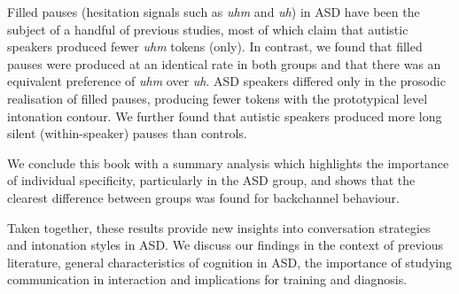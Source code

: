 Filled pauses (hesitation signals such as \emph{uhm} and \emph{uh}) in ASD have been the subject of a handful of previous studies, most of which claim that autistic speakers produced fewer \emph{uhm} tokens (only). In contrast, we found that filled pauses were produced at an identical rate in both groups and that there was an equivalent preference of \emph{uhm} over \emph{uh}. ASD speakers differed only in the prosodic realisation of filled pauses, producing fewer tokens with the prototypical level intonation contour. We further found that autistic speakers produced more long silent (within-speaker) pauses than controls.

We conclude this book with a summary analysis which highlights the importance of individual specificity, particularly in the ASD group, and shows that the clearest difference between groups was found for backchannel behaviour.

Taken together, these results provide new insights into conversation strategies and intonation styles in ASD. We discuss our findings in the context of previous literature, general characteristics of cognition in ASD, the importance of studying communication in interaction and implications for training and diagnosis.